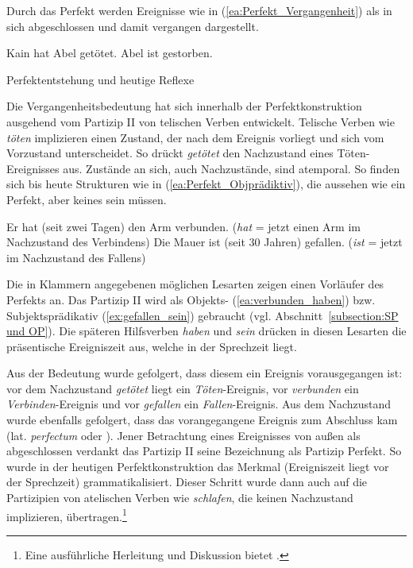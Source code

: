 Durch das Perfekt werden Ereignisse wie in (\ref{ea:Perfekt_Vergangenheit}) als in sich abgeschlossen und damit vergangen dargestellt.

\ea \label{ea:Perfekt_Vergangenheit}
\ea \label{ea:hat_getötet} Kain hat Abel getötet.
\ex \label{ex:ist_gestoreb} Abel ist gestorben.
\z
\z 


\begin{Exkurs}{Perfektentstehung und heutige Reflexe}\label{Exkurs:Perfektentsteht}
    
Die Vergangenheitsbedeutung hat sich innerhalb der Perfektkonstruktion ausgehend vom Partizip II von telischen Verben entwickelt. Telische Verben wie \textit{töten} implizieren einen Zustand, der nach dem Ereignis vorliegt und sich vom Vorzustand unterscheidet. So drückt \textit{getötet} den Nachzustand eines Töten-Ereignisses aus. Zustände an sich, auch Nachzustände, sind atemporal. So finden sich bis heute Strukturen wie in (\ref{ea:Perfekt_Objprädiktiv}), die aussehen wie ein Perfekt, aber keines sein müssen.

\ea \label{ea:Perfekt_Objprädiktiv}
\ea \label{ea:verbunden_haben} Er hat (seit zwei Tagen) den Arm verbunden. (\textit{hat} =  jetzt einen Arm im Nachzustand des Verbindens)
\ex \label{ex:gefallen_sein} Die Mauer ist (seit 30 Jahren) gefallen. (\textit{ist} =  jetzt im Nachzustand des Fallens)
\z 
\z 

Die in Klammern angegebenen möglichen Lesarten zeigen einen Vorläufer des Perfekts an. Das Partizip II wird als Objekts- (\ref{ea:verbunden_haben}) bzw. Subjektsprädikativ (\ref{ex:gefallen_sein}) gebraucht (vgl. Abschnitt~\ref{subsection:SP und OP}). Die späteren Hilfsverben \textit{haben} und \textit{sein} drücken in diesen Lesarten die präsentische Ereigniszeit aus, welche in der Sprechzeit liegt.

Aus der Bedeutung  wurde gefolgert, dass diesem ein Ereignis vorausgegangen ist: vor dem Nachzustand \textit{getötet} liegt ein \textit{Töten}-Ereignis, vor \textit{verbunden} ein \textit{Verbinden}-Ereignis und vor \textit{gefallen} ein \textit{Fallen}-Ereignis. Aus dem Nachzustand wurde ebenfalls gefolgert, dass das vorangegangene Ereignis zum Abschluss kam (lat. \textit{perfectum}  oder ). Jener Betrachtung eines Ereignisses von außen als abgeschlossen verdankt das Partizip II seine Bezeichnung als Partizip Perfekt. So wurde in der heutigen Perfektkonstruktion das Merkmal  (Ereigniszeit liegt vor der Sprechzeit) grammatikalisiert. Dieser Schritt wurde dann auch auf die Partizipien von atelischen Verben wie \textit{schlafen}, die keinen Nachzustand implizieren, übertragen.\footnote{Eine ausführliche Herleitung und Diskussion bietet \citet[194--217]{Welke2005Temp}.}

\end{Exkurs}


